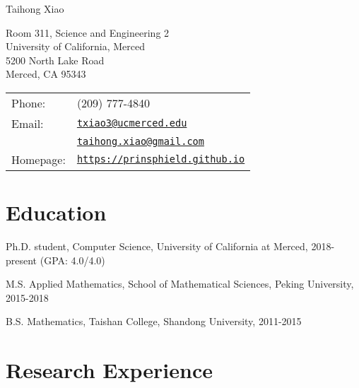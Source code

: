 \documentclass[letterpaper]{article}
\def\name{Taihong Xiao}
\renewenvironment{itemize}{
  \begin{list}{}{
    \setlength{\leftmargin}{1.5em}
  }
}{
  \end{list}
}
\begin{document}
{\huge \name}


\vspace{0.25in}



\begin{minipage}{0.45\linewidth}
	Room 311, Science and Engineering 2\\
	University of California, Merced\\
	5200 North Lake Road\\
	Merced, CA 95343
\end{minipage}
\begin{minipage}{0.45\linewidth}
  \begin{tabular}{ll}
    Phone:  & (209) 777-4840 \\
    Email:  & \href{mailto:txiao3@ucmerced.edu}{\tt txiao3@ucmerced.edu} \\
    		& \href{mailto:taihong.xiao@gmail.com}{\tt taihong.xiao@gmail.com}\\
    Homepage: & \href{https://prinsphield.github.io}{\tt https://prinsphield.github.io} \\
  \end{tabular}
\end{minipage}


\section*{Education}

\begin{itemize}

  \item Ph.D. student, Computer Science, University of California at Merced, 2018-present (GPA: 4.0/4.0)

  \item M.S. Applied Mathematics, School of Mathematical Sciences, Peking University, 2015-2018

  \item B.S. Mathematics, Taishan College, Shandong University, 2011-2015

\end{itemize}



\section*{Research Experience}
\end{document}
